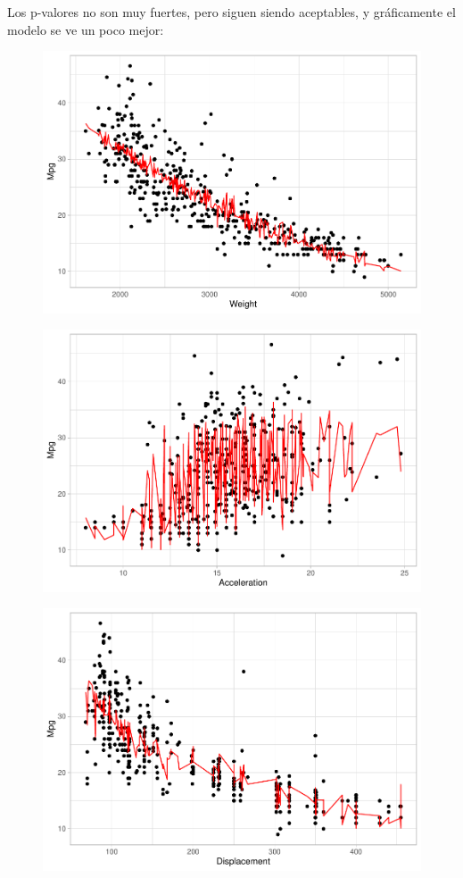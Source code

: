 Los p-valores no son muy fuertes, pero siguen siendo aceptables, y gráficamente el modelo se ve un poco mejor:

\begin{figure}[H]\center\includegraphics[width=.85\linewidth]{img/Regresion_files/figure-latex/unnamed-chunk-26-1} \caption{}\end{figure}

\begin{figure}[H]\includegraphics[width=.94\linewidth]{img/Regresion_files/figure-latex/unnamed-chunk-26-2} \caption{}\end{figure}

\begin{figure}[H]\includegraphics[width=.94\linewidth]{img/Regresion_files/figure-latex/unnamed-chunk-26-3} \caption{}\end{figure}

